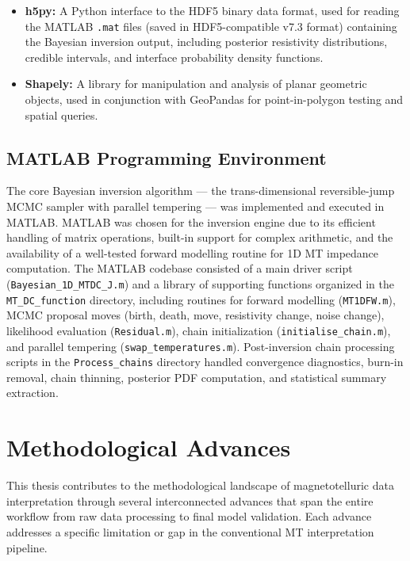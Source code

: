 \begin{itemize}
    \item \textbf{h5py:} A Python interface to the HDF5 binary data format, used for reading the MATLAB \texttt{.mat} files (saved in HDF5-compatible v7.3 format) containing the Bayesian inversion output, including posterior resistivity distributions, credible intervals, and interface probability density functions.

    \item \textbf{Shapely:} A library for manipulation and analysis of planar geometric objects, used in conjunction with GeoPandas for point-in-polygon testing and spatial queries.
\end{itemize}

\subsection*{MATLAB Programming Environment}

The core Bayesian inversion algorithm --- the trans-dimensional reversible-jump MCMC sampler with parallel tempering --- was implemented and executed in MATLAB. MATLAB was chosen for the inversion engine due to its efficient handling of matrix operations, built-in support for complex arithmetic, and the availability of a well-tested forward modelling routine for 1D MT impedance computation. The MATLAB codebase consisted of a main driver script (\texttt{Bayesian\_1D\_MTDC\_J.m}) and a library of supporting functions organized in the \texttt{MT\_DC\_function} directory, including routines for forward modelling (\texttt{MT1DFW.m}), MCMC proposal moves (birth, death, move, resistivity change, noise change), likelihood evaluation (\texttt{Residual.m}), chain initialization (\texttt{initialise\_chain.m}), and parallel tempering (\texttt{swap\_temperatures.m}). Post-inversion chain processing scripts in the \texttt{Process\_chains} directory handled convergence diagnostics, burn-in removal, chain thinning, posterior PDF computation, and statistical summary extraction.


\section*{Methodological Advances}

This thesis contributes to the methodological landscape of magnetotelluric data interpretation through several interconnected advances that span the entire workflow from raw data processing to final model validation. Each advance addresses a specific limitation or gap in the conventional MT interpretation pipeline.

